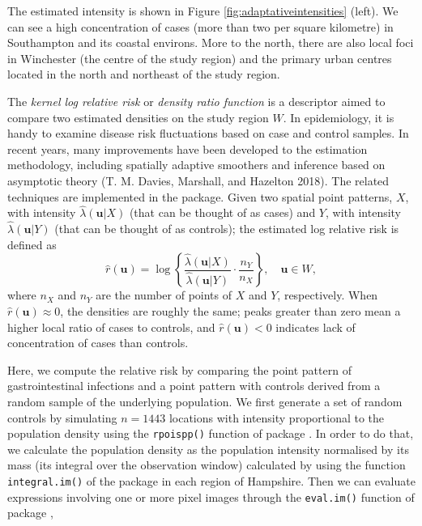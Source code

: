 The estimated intensity is shown in Figure \ref{fig:adaptativeintensities} (left). We can see a high concentration of cases (more than two per square kilometre) in Southampton and its coastal environs. More to the north, there are also local foci in Winchester (the centre of the study region) and the primary urban centres located in the north and northeast of the study region.

The \emph{kernel log relative risk} or \emph{density ratio function} is a descriptor aimed to compare two estimated densities on the study region \(W\). In epidemiology, it is handy to examine disease risk fluctuations based on case and control samples. In recent years, many improvements have been developed to the estimation methodology, including spatially adaptive smoothers and inference based on asymptotic theory (T. M. Davies, Marshall, and Hazelton 2018). The related techniques are implemented in the  package. Given two spatial point patterns, \(X\), with intensity \(\hat{\lambda}(\mathbf{u}|X)\) (that can be thought of as cases) and \(Y\), with intensity \(\hat{\lambda}(\mathbf{u}|Y)\) (that can be thought of as controls); the estimated log relative risk is defined as
\begin{equation}
    \hat{r}(\mathbf{u})=\log \left\{\frac{\hat{\lambda}(\mathbf{u}|X)}{\hat{\lambda}(\mathbf{u}|Y) } \cdot \frac{n_Y}{n_X} \right\}, \quad \mathbf{u} \in W,
    \label{eq:relrisk}
\end{equation}
where \(n_X\) and \(n_Y\) are the number of points of \(X\) and \(Y\), respectively. When \(\hat{r}(\mathbf{u}) \approx 0\), the densities are roughly the same; peaks greater than zero mean a higher local ratio of cases to controls, and \(\hat{r}(\mathbf{u}) < 0\) indicates lack of concentration of cases than controls.

Here, we compute the relative risk by comparing the point pattern of gastrointestinal infections and a point pattern with controls derived from a random sample of the underlying population. We first generate a set of random controls by simulating \(n=1443\) locations with intensity proportional to the population density using the \texttt{rpoispp()} function of package . In order to do that, we calculate the population density as the population intensity normalised by its mass (its integral over the observation window) calculated by using the function \texttt{integral.im()} of the package  in each region of Hampshire. Then we can evaluate expressions involving one or more pixel images through the \texttt{eval.im()} function of package ,

